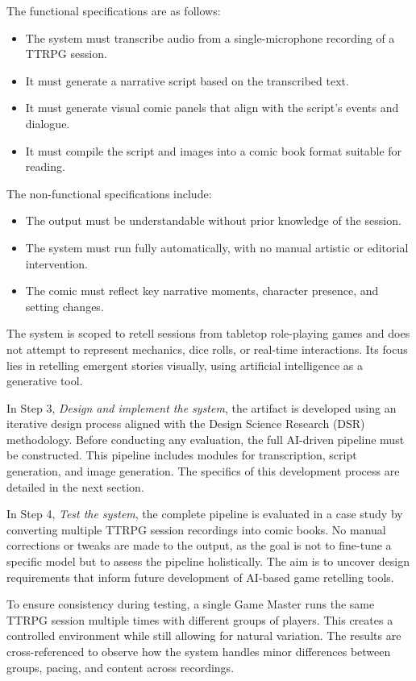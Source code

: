 The functional specifications are as follows:
\begin{itemize}
  \item The system must transcribe audio from a single-microphone recording of a TTRPG session.
  \item It must generate a narrative script based on the transcribed text.
  \item It must generate visual comic panels that align with the script's events and dialogue.
  \item It must compile the script and images into a comic book format suitable for reading.
\end{itemize}

The non-functional specifications include:
\begin{itemize}
  \item The output must be understandable without prior knowledge of the session.
  \item The system must run fully automatically, with no manual artistic or editorial intervention.
  \item The comic must reflect key narrative moments, character presence, and setting changes.
\end{itemize}

The system is scoped to retell sessions from tabletop role-playing games and does not attempt to represent mechanics, dice rolls, or real-time interactions. Its focus lies in retelling emergent stories visually, using artificial intelligence as a generative tool.

In Step 3, \textit{Design and implement the system}, the artifact is developed using an iterative design process aligned with the Design Science Research (DSR) methodology. Before conducting any evaluation, the full AI-driven pipeline must be constructed. This pipeline includes modules for transcription, script generation, and image generation. The specifics of this development process are detailed in the next section.

In Step 4, \textit{Test the system}, the complete pipeline is evaluated in a case study by converting multiple TTRPG session recordings into comic books. No manual corrections or tweaks are made to the output, as the goal is not to fine-tune a specific model but to assess the pipeline holistically. The aim is to uncover design requirements that inform future development of AI-based game retelling tools.

To ensure consistency during testing, a single Game Master runs the same TTRPG session multiple times with different groups of players. This creates a controlled environment while still allowing for natural variation. The results are cross-referenced to observe how the system handles minor differences between groups, pacing, and content across recordings.

